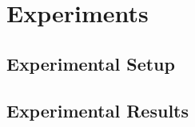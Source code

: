 
\section{Experiments}
\label{sec:exp}

\subsection{Experimental Setup}
\label{sec:exp:setup}





\subsection{Experimental Results}


